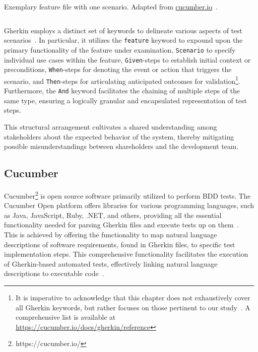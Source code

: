 \begin{listing}[!ht]
\caption{Exemplary feature file with one scenario. Adapted from 
\href{https://cucumber.io/blog/bdd/getting-started-with-bdd-part-1/}{cucumber.io}~\cite{noauthor_getting_nodate}.}
\label{lst:withdrawcash}
\inputminted[linenos, xleftmargin=2em]{gherkin}{files/code/atm.feature}
\end{listing}

Gherkin employs a distinct set of keywords to delineate various aspects of test scenarios~\cite{noauthor_gherkin_nodate}. In particular, it utilizes the \texttt{feature} keyword to expound upon the primary functionality of the feature under examination, \texttt{Scenario} to specify individual use cases within the feature, \texttt{Given}-steps to establish initial context or preconditions, \texttt{When}-steps for denoting the event or action that triggers the scenario, and \texttt{Then}-steps for articulating anticipated outcomes for validation\footnote{It is imperative to acknowledge that this chapter does not exhaustively cover all Gherkin keywords, but rather focuses on those pertinent to our study~\cite{noauthor_gherkin_nodate}. A comprehensive list is available at \href{https://cucumber.io/docs/gherkin/reference/\#keywords}{https://cucumber.io/docs/gherkin/reference}}. Furthermore, the \texttt{And} keyword facilitates the chaining of multiple steps of the same type, ensuring a logically granular and encapsulated representation of test steps. 

This structural arrangement cultivates a shared understanding among stakeholders about the expected behavior of the system, thereby mitigating possible misunderstandings between shareholders and the development team.

\subsection{Cucumber}
\label{subsec:cucumber}
Cucumber\footnote{https://cucumber.io/} is open source software primarily utilized to perform \ac{BDD} tests. The Cucumber Open platform offers libraries for various programming languages, such as Java, JavaScript, Ruby, .NET, and others, providing all the essential functionality needed for parsing Gherkin files and execute tests up on them~\cite{noauthor_cucumber_nodate}. This is achieved by offering the functionality to map natural language descriptions of software requirements, found in Gherkin files, to specific test implementation steps. This comprehensive functionality facilitates the execution of Gherkin-based automated tests, effectively linking natural language descriptions to executable code~\cite{wynne2012cucumber}.

